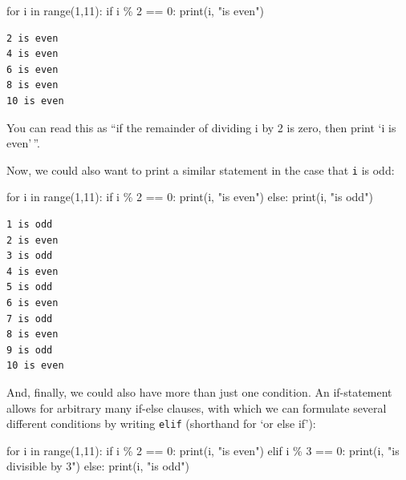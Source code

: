 \documentclass[
  a4paperpaper,
  ,captions=tableheading
]{scrbook}
\newenvironment{Shaded}{\begin{snugshade}}{\end{snugshade}}
\newcommand{\BuiltInTok}[1]{\textcolor[rgb]{0.00,0.23,0.31}{#1}}
\newcommand{\ControlFlowTok}[1]{\textcolor[rgb]{0.00,0.23,0.31}{#1}}
\newcommand{\DecValTok}[1]{\textcolor[rgb]{0.68,0.00,0.00}{#1}}
\newcommand{\KeywordTok}[1]{\textcolor[rgb]{0.00,0.23,0.31}{#1}}
\newcommand{\NormalTok}[1]{\textcolor[rgb]{0.00,0.23,0.31}{#1}}
\newcommand{\OperatorTok}[1]{\textcolor[rgb]{0.37,0.37,0.37}{#1}}
\newcommand{\StringTok}[1]{\textcolor[rgb]{0.13,0.47,0.30}{#1}}
\begin{document}
\begin{Shaded}
\begin{Highlighting}[]
\ControlFlowTok{for}\NormalTok{ i }\KeywordTok{in} \BuiltInTok{range}\NormalTok{(}\DecValTok{1}\NormalTok{,}\DecValTok{11}\NormalTok{):}
    \ControlFlowTok{if}\NormalTok{ i }\OperatorTok{\%} \DecValTok{2} \OperatorTok{==} \DecValTok{0}\NormalTok{:}
        \BuiltInTok{print}\NormalTok{(i, }\StringTok{"is even"}\NormalTok{)}
\end{Highlighting}
\end{Shaded}

\begin{verbatim}
2 is even
4 is even
6 is even
8 is even
10 is even
\end{verbatim}

You can read this as ``if the remainder of dividing i by 2 is zero, then
print `i is even'\,''.

Now, we could also want to print a similar statement in the case that
\texttt{i} is odd:

\begin{Shaded}
\begin{Highlighting}[]
\ControlFlowTok{for}\NormalTok{ i }\KeywordTok{in} \BuiltInTok{range}\NormalTok{(}\DecValTok{1}\NormalTok{,}\DecValTok{11}\NormalTok{):}
    \ControlFlowTok{if}\NormalTok{ i }\OperatorTok{\%} \DecValTok{2} \OperatorTok{==} \DecValTok{0}\NormalTok{:}
        \BuiltInTok{print}\NormalTok{(i, }\StringTok{"is even"}\NormalTok{)}
    \ControlFlowTok{else}\NormalTok{:}
        \BuiltInTok{print}\NormalTok{(i, }\StringTok{"is odd"}\NormalTok{)}
\end{Highlighting}
\end{Shaded}

\begin{verbatim}
1 is odd
2 is even
3 is odd
4 is even
5 is odd
6 is even
7 is odd
8 is even
9 is odd
10 is even
\end{verbatim}

And, finally, we could also have more than just one condition. An
if-statement allows for arbitrary many if-else clauses, with which we
can formulate several different conditions by writing \texttt{elif}
(shorthand for `or else if'):

\begin{Shaded}
\begin{Highlighting}[]
\ControlFlowTok{for}\NormalTok{ i }\KeywordTok{in} \BuiltInTok{range}\NormalTok{(}\DecValTok{1}\NormalTok{,}\DecValTok{11}\NormalTok{):}
    \ControlFlowTok{if}\NormalTok{ i }\OperatorTok{\%} \DecValTok{2} \OperatorTok{==} \DecValTok{0}\NormalTok{:}
        \BuiltInTok{print}\NormalTok{(i, }\StringTok{"is even"}\NormalTok{)}
    \ControlFlowTok{elif}\NormalTok{ i }\OperatorTok{\%} \DecValTok{3} \OperatorTok{==} \DecValTok{0}\NormalTok{:}
        \BuiltInTok{print}\NormalTok{(i, }\StringTok{"is divisible by 3"}\NormalTok{)}
    \ControlFlowTok{else}\NormalTok{:}
        \BuiltInTok{print}\NormalTok{(i, }\StringTok{"is odd"}\NormalTok{)}
\end{Highlighting}
\end{Shaded}
\end{document}

